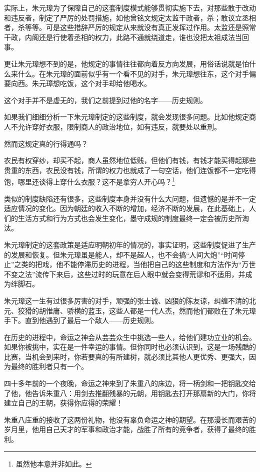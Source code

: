 \begin{multicols}{\theparacolNo}
		实际上，朱元璋为了保障自己的这套制度模式能够贯彻实施下去，对那些敢于改动和违反者，制定了严厉的处罚措施，如他曾铭文规定太监干政者，杀；敢议立丞相者，杀等等。可是这些措辞严厉的规定从来就没有真正发挥过作用。太监还是照常干政，内阁还是行使着丞相的权力，此路不通就绕道走，谁也没把太祖成法当回事。

		更让朱元璋想不到的是，他规定的事情往往都向着反方向发展，用俗话说就是怕什么来什么。在朱元璋的面前似乎有一个看不见的对手，朱元璋想往东，这个对手偏要向西。朱元璋想吃饭，这个对手却给他喝水。

		这个对手并不是虚无的，我们之前提到过他的名字——历史规则。

		如果我们细细分析一下朱元璋制定的这些制度，就会发现很多问题。比如他规定商人不允许穿好衣服，限制商人的政治地位，如有违反，就要处以重刑。

		然而这规定真的行得通吗？

		农民有权穿纱，却买不起，商人虽然地位低贱，但他们有钱，有钱才能买得起那些贵重的东西，农民没有钱，所谓的权力也就成了一句空话，他们连饭都不一定吃得饱，哪里还谈得上穿什么衣服？这不是拿穷人开心吗？\footnote{虽然他本意并非如此。}

		类似的制度缺陷还有很多，这些制度本身并没有什么大问题，但遗憾的是并不一定适应情况的变化。因为朝廷的收入不断的增加，经济不断的发展，在此基础上，人们的生活方式和行为方式也会发生变化，墨守成规的制度最终一定会被历史所淘汰。

		朱元璋制定的这套政策是适应明朝初年的情况的，事实证明，这些制度促进了生产的发展和恢复。但朱元璋虽是能人，却不是超人，也不会搞“人间大炮”“时间停止”之类的把戏，他不能停滞历史的进程，当他把自己的这些制度和方法作为“万世不变之法”流传下来后，这些过时的玩意在后人眼中就会变得荒谬和不适用，并成为绊脚石。

		朱元璋这一生有过很多厉害的对手，顽强的张士诚、凶狠的陈友谅，纠缠不清的北元、狡猾的胡惟庸、骄横的蓝玉，这些人都是一代人杰，然而他们都败在了朱元璋手下。直到他遇到了最后一个敌人——历史规则。

		在历史的进程中，命运之神会从芸芸众生中挑选一些人，给他们建功立业的机会。如果你被挑中，实在是一件幸运的事情。但你同时也必须认识到，这是一场残酷的比赛，当机会到来时，你若要真的有所建树，就必须比其他人更优秀、更强大，因为最终的胜利者只有一个。

		四十多年前的一个夜晚，命运之神来到了朱重八的床边，将一柄剑和一把钥匙交给了他，他告诉朱重八：用剑去推翻残暴的元朝，用钥匙去打开那扇新的大门，你将建立自己的王朝，获得你应得的荣耀！

		朱重八庄重的接收了这两份礼物，他没有辜负命运之神的期望。在那漫长而艰苦的岁月里，他用自己天才的军事和政治才能，战胜了所有的竞争者，获得了最终的胜利。


\end{multicols}
